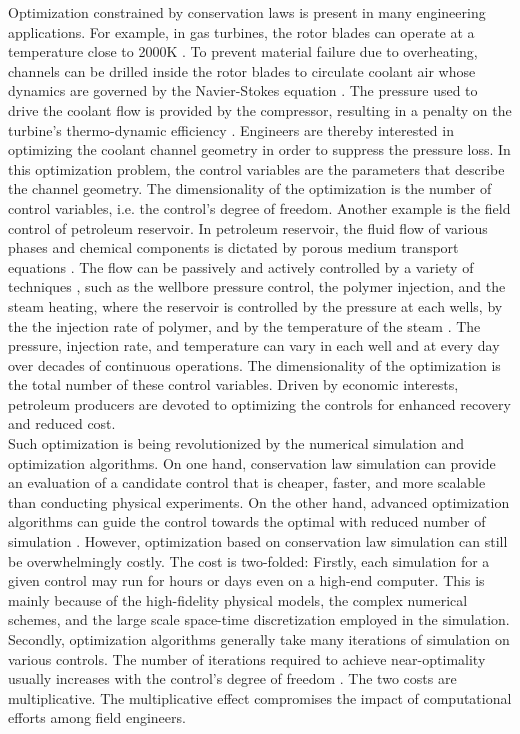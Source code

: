 Optimization constrained by conservation laws is present in many engineering applications.
For example, in gas turbines, the rotor blades can operate at a temperature close to 2000K \cite{airfoil cooling}.
To prevent material failure due to overheating, channels can be drilled inside the rotor blades
to circulate coolant air whose dynamics are governed by the Navier-Stokes equation 
\cite{ubend rans opt 1}. The pressure
used to drive the coolant flow is provided by the compressor, resulting in a penalty on the 
turbine's thermo-dynamic efficiency \cite{ubend rans opt 2}. 
Engineers are thereby interested in optimizing the coolant
channel geometry in order to suppress the pressure loss. In this optimization problem, the control variables
are the parameters that describe the channel geometry. The dimensionality of the optimization is the
number of control variables, i.e. the control's degree of freedom.
Another example is the field control of petroleum
reservoir. In petroleum reservoir, the fluid flow of various phases and chemical components 
is dictated by porous medium transport equations \cite{reservoir sim book}. The flow can be passively and actively controlled by a variety of techniques \cite{first reservoir opt},
such as the wellbore pressure control, the polymer injection, and the steam heating,
where the reservoir is controlled by the pressure at each wells, by the the injection rate of polymer, and by the temperature of the steam \cite{secondary recovery review}.
The pressure, injection rate, and temperature can vary in each well and at every day over decades of continuous operations.
The dimensionality of the optimization is
the total number of these control variables.
Driven by economic interests, petroleum producers are 
devoted to optimizing the controls for enhanced recovery and reduced cost.\\

Such optimization is being revolutionized by the numerical simulation and optimization
algorithms. On one hand, conservation law simulation can provide an evaluation of a candidate control
that is cheaper, faster, and more scalable than conducting physical experiments. 
On the other hand, advanced optimization algorithms can guide 
the control towards the optimal with reduced number of simulation \cite{quasiNewton, gradfreereview, LBFGS, trustregionconn, genetic algo, particle swarm, cuckoo, review EI}.
However, optimization based on conservation law simulation can still be overwhelmingly costly. 
The cost is two-folded: Firstly, each simulation for a given control may run for hours or days even on a high-end
computer. This is mainly because of the high-fidelity physical models, the complex numerical schemes, and the large scale space-time 
discretization employed in the simulation. Secondly, optimization algorithms generally take many iterations of simulation on
various controls. The number of iterations required to achieve near-optimality usually 
increases with the control's degree of freedom \cite{opt via sim review}. The two costs are multiplicative.
The multiplicative effect compromises the impact of computational efforts among field engineers.\\

